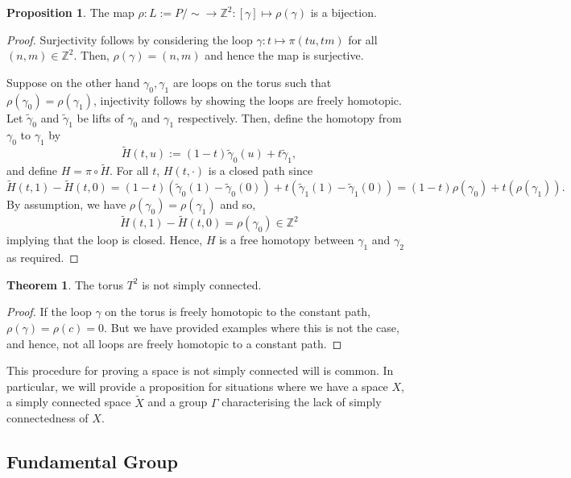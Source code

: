 \documentclass[]{article}
\theoremstyle{definition}
\newtheorem{theorem}{Theorem}
\theoremstyle{definition}
\newtheorem{proposition}{Proposition}[section]
\begin{document}
\begin{proposition}
  The map \(\rho : L := P / \sim \to \mathbb{Z}^2 : [\gamma] \mapsto \rho(\gamma)\)
  is a bijection.
\end{proposition}
\begin{proof}
  Surjectivity follows by considering the loop \(\gamma : t \mapsto \pi(tu, tm)\) for all 
  \((n, m) \in \mathbb{Z}^2\). Then, \(\rho(\gamma) = (n, m)\) and hence the map 
  is surjective.

  Suppose on the other hand \(\gamma_0, \gamma_1\) are loops on the torus such that 
  \(\rho(\gamma_0) = \rho(\gamma_1)\), injectivity follows by showing the loops are 
  freely homotopic. Let \(\tilde \gamma_0\) and \(\tilde \gamma_1\) be lifts of 
  \(\gamma_0\) and \(\gamma_1\) respectively. Then, define the homotopy from 
  \(\gamma_0\) to \(\gamma_1\) by
  \[\tilde H(t, u) := (1 - t)\tilde \gamma_0(u) + t \tilde \gamma_1,\]
  and define \(H = \pi \circ \tilde H\). For all \(t\), \(H(t, \cdot)\) is a 
  closed path since 
  \[\tilde H(t, 1) - \tilde H(t, 0) = (1 - t)(\tilde \gamma_0(1) - \tilde \gamma_0(0))
    + t(\tilde \gamma_1(1) - \tilde \gamma_1(0)) = (1 - t)\rho(\gamma_0) + t(\rho(\gamma_1)).\]
  By assumption, we have \(\rho(\gamma_0) = \rho(\gamma_1)\) and so, 
  \[\tilde H(t, 1) - \tilde H(t, 0) = \rho(\gamma_0) \in \mathbb{Z}^2\]
  implying that the loop is closed. Hence, \(H\) is a free homotopy between 
  \(\gamma_1\) and \(\gamma_2\) as required.
\end{proof}

\begin{theorem}
  The torus \(T^2\) is not simply connected.
\end{theorem}
\begin{proof}
  If the loop \(\gamma\) on the torus is freely homotopic to the constant path, 
  \(\rho(\gamma) = \rho(c) = 0\). But we have provided examples where this is not the case, 
  and hence, not all loops are freely homotopic to a constant path.
\end{proof}

This procedure for proving a space is not simply connected will is common. In particular, 
we will provide a proposition for situations where we have a space \(X\), a simply 
connected space \(\tilde X\) and a group \(\Gamma\) 
characterising the lack of simply connectedness of \(X\).

\subsection{Fundamental Group}
\end{document}
